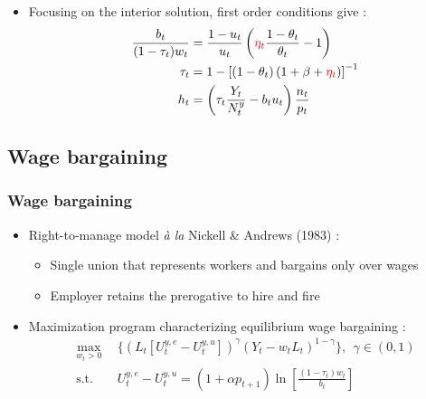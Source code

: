 \documentclass{beamer}
\begin{document}
			\begin{frame}
				\begin{itemize}
					\item Focusing on the interior solution, first order conditions give :
						\begin{align*}
						\frac{b_t}{(1-\tau_t)w_t} &= \frac{1-u_t}{u_t} \left(\textcolor{red}{\eta_t}\frac{1-\theta_t}{\theta_t}- 1\right)\\
						\tau_t &= 1 - \left[\left(1-\theta_t\right)\left(1+\beta+\textcolor{red}{\eta_t}\right)\right]^{-1}\\
						h_t &= \left(\tau_t \frac{Y_t}{N_t^y} - b_t u_t\right)\frac{n_t}{p_t}
						\end{align*}
				\end{itemize}
			\end{frame}	
		\subsection{Wage bargaining}
			\begin{frame}\frametitle{Wage bargaining}
				\begin{itemize}
					\item Right-to-manage model \textit{à la} Nickell \& Andrews (1983) :
					\begin{itemize}
						\item Single union that represents workers and bargains only over wages
						\item Employer retains the prerogative to hire and fire
					\end{itemize}
				\end{itemize}
				\vspace{1em}
				\begin{itemize}
					\item Maximization program characterizing equilibrium wage bargaining :
					\begin{align*}
						\max_{w_t>0} ~~ &\lbrace \left(L_t[U^{y,e}_t - U^{y,u}_t]\right)^\gamma \left(Y_t-w_tL_t\right)^{1-\gamma}\rbrace,~~\gamma\in(0,1)\\
						\text{s.t.} ~~ &U_t^{y,e} - U_t^{y,u} = (1+\alpha p_{t+1})\ln\left[\frac{(1-\tau_t)w_t}{b_t}\right]
					\end{align*}
				\end{itemize}				
			\end{frame}
\end{document}

